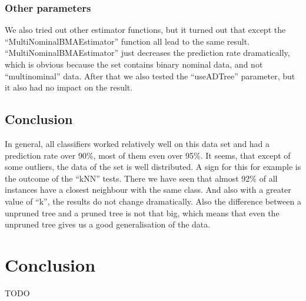 \documentclass{article}
\begin{document}
 
\subsubsection{Other parameters}

We also tried out other estimator functions, but it turned out that except the “MultiNominalBMAEstimator” function all lead to the same result. “MultiNominalBMAEstimator” just decreases the prediction rate dramatically, which is obvious because the set contains binary nominal data, and not “multinominal” data. After that we also tested the “useADTree” parameter, but it also had no impact on the result. 

\subsection{Conclusion}

In general, all classifiers worked relatively well on this data set and had a prediction rate over 90\%, most of them even over 95\%. It seems, that except of some outliers, the data of the set is well distributed. A sign for this for example is the outcome of the “kNN” tests. There we have seen that almost 92\% of all instances have a closest neighbour with the same class. And also with a greater value of “k”, the results do not change dramatically. Also the difference between a unpruned tree and a pruned tree is not that big, which means that even the unpruned tree gives us a good generalisation of the data. 
 
 
 



\section{Conclusion}
TODO\\
\end{document}
